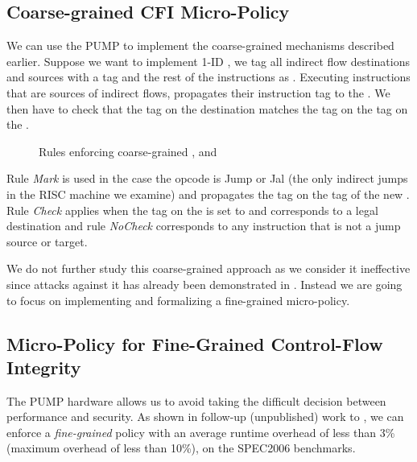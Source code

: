 \subsection{Coarse-grained CFI Micro-Policy}\label{sec:cfi_coarse}

We can use the PUMP to implement the coarse-grained \CFI mechanisms described
earlier. Suppose we want to implement 1-ID \CFI, we tag all indirect flow
destinations and sources with a tag \MARK{} and the rest of the instructions as
\UNMARK. Executing instructions that are sources of indirect flows, propagates
their instruction tag to the \pc. We then have to check that the tag on the
destination matches the tag on the tag on the \pc.

\begin{figure}[htb!]
\bigskip

\bigskip

\caption{Rules enforcing coarse-grained \CFI, \NXD and \NWC}
\end{figure}

Rule \emph{Mark} is used in the case the opcode is Jump or Jal (the
only indirect jumps in the RISC machine we examine) and propagates the
\MARKname tag on the tag of the new \pc. Rule \emph{Check} applies
when the tag on the \pc is set to \MARKname and corresponds to a legal
destination and rule \emph{NoCheck} corresponds to any instruction
that is not a jump source or target.

We do not further study this coarse-grained approach as we consider it
ineffective since attacks against it has already been demonstrated in
\cite{outofcontrol_ieeesp2014}. Instead we are going to focus on
implementing and formalizing a fine-grained \CFI micro-policy.

\subsection{Micro-Policy for Fine-Grained Control-Flow Integrity}
\label{sec:cfi_fine}


The PUMP hardware allows us to avoid taking the difficult decision
between performance and security. As shown in follow-up (unpublished)
work to \cite{pump_hasp2014}, we can enforce a \emph{fine-grained}
\CFI policy with an average runtime overhead of less than 3\% (maximum
overhead of less than 10\%), on the SPEC2006 benchmarks.

